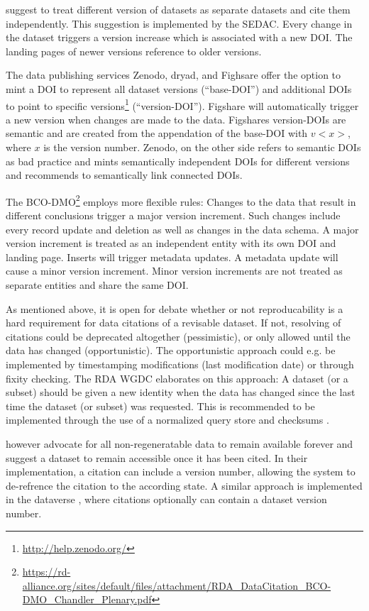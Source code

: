 \documentclass[a4paper,10pt]{article}
\begin{document}
\citep{AltKin07} suggest to treat different version of datasets as separate datasets and cite them independently. This suggestion is implemented by the \gls{SEDAC}\cite{Downs2013}. Every change in the dataset triggers a version increase which is associated with a new \gls{DOI}. The landing pages of newer versions reference to older versions. 

The data publishing services Zenodo, dryad, and Fighsare offer the option to mint a \gls{DOI} to represent all dataset versions (``base-DOI'') and additional \glspl{DOI} to point to specific versions\footnote{\url{http://help.zenodo.org/}} (``version-DOI''). Figshare will automatically trigger a new version when changes are made to the data. Figshares version-\glspl{DOI} are semantic and are created from the appendation of the base-DOI with $v<x>$, where $x$ is the version number. Zenodo, on the other side refers to semantic \glspl{DOI} as bad practice and mints semantically independent \glspl{DOI} for different versions and recommends to semantically link connected \glspl{DOI}.

The \gls{BCO-DMO}\footnote{\url{https://rd-alliance.org/sites/default/files/attachment/RDA_DataCitation_BCO-DMO_Chandler_Plenary.pdf}} employs more flexible rules: Changes to the data that result in different conclusions trigger a major version increment. 
Such changes include every record update and deletion as well as changes in the data schema.
A major version increment is treated as an independent entity with its own \gls{DOI} and landing page. Inserts will trigger metadata updates. A metadata update will cause a minor version increment. Minor version increments are not treated as separate entities and share the same \gls{DOI}.

As mentioned above, it is open for debate whether or not reproducability is a hard requirement for data citations of a revisable dataset. If not, resolving of citations could be deprecated altogether (pessimistic), or only allowed until the data has changed (opportunistic). The opportunistic approach could e.g. be implemented by timestamping modifications (last modification date) or through fixity checking. The \gls{RDA} \gls{WGDC} \citep{Rauber2015} elaborates on this approach: A dataset (or a subset) should be given a new identity when the data has changed since the last time the dataset (or subset) was requested. This is recommended to be implemented through the use of a normalized query store and checksums \citep{Ball2015}.

\cite{Gray2002} however advocate for all non-regeneratable data to remain available forever and  \cite{Buneman2010} suggest a dataset to remain accessible once it has been cited. In their implementation, a citation can include a version number, allowing the system to de-refrence the citation to the according state. A similar approach is implemented in the dataverse \citep{Crosas2011}, where citations optionally can contain a dataset version number. 
\end{document}
